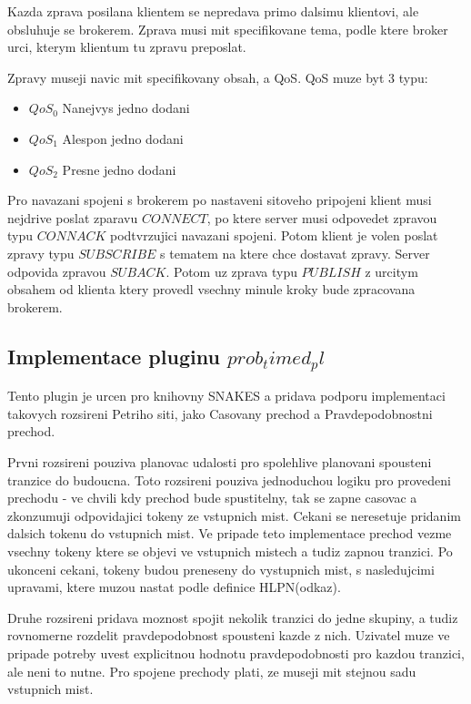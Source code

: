 Kazda zprava posilana klientem se nepredava primo dalsimu klientovi, ale obsluhuje se brokerem. Zprava musi mit specifikovane tema, podle ktere broker urci, kterym klientum tu zpravu preposlat.

Zpravy museji navic mit specifikovany obsah, a QoS. QoS muze byt 3 typu:
\begin{itemize}
  \item $QoS_0$ Nanejvys jedno dodani \\
  \item $QoS_1$ Alespon jedno dodani \\
  \item $QoS_2$ Presne jedno dodani 
\end{itemize}

Pro navazani spojeni s brokerem po nastaveni sitoveho pripojeni klient musi nejdrive poslat zparavu $CONNECT$, po ktere server musi odpovedet zpravou typu $CONNACK$ podtvrzujici navazani spojeni. Potom klient je volen poslat zpravy typu $SUBSCRIBE$ s tematem na ktere chce dostavat zpravy. Server odpovida zpravou $SUBACK$. Potom uz zprava typu $PUBLISH$ z urcitym obsahem od klienta ktery provedl vsechny minule kroky bude zpracovana brokerem.
\subsection{Implementace pluginu $prob_timed_pl$}
Tento plugin je urcen pro knihovny SNAKES a pridava podporu implementaci takovych rozsireni Petriho siti, jako Casovany prechod a Pravdepodobnostni prechod.

Prvni rozsireni pouziva planovac udalosti pro spolehlive planovani spousteni tranzice do budoucna. Toto rozsireni pouziva jednoduchou logiku pro provedeni prechodu - ve chvili kdy prechod bude spustitelny, tak se zapne casovac a zkonzumuji odpovidajici tokeny ze vstupnich mist. Cekani se neresetuje pridanim dalsich tokenu do vstupnich mist. Ve pripade teto implementace prechod vezme vsechny tokeny ktere se objevi ve vstupnich mistech a tudiz zapnou tranzici. Po ukonceni cekani, tokeny budou preneseny do vystupnich mist, s nasledujcimi upravami, ktere muzou nastat podle definice HLPN(odkaz).

Druhe rozsireni pridava moznost spojit nekolik tranzici do jedne skupiny, a tudiz rovnomerne rozdelit pravdepodobnost spousteni kazde z nich. Uzivatel muze ve pripade potreby uvest explicitnou hodnotu pravdepodobnosti pro kazdou tranzici, ale neni to nutne. Pro spojene prechody plati, ze museji mit stejnou sadu vstupnich mist. 

